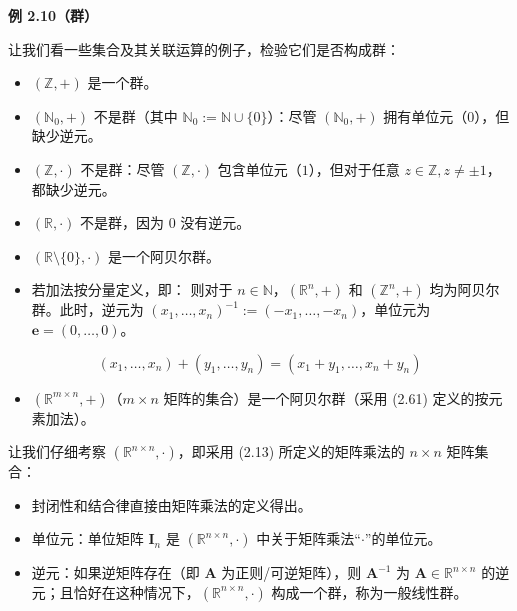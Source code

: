 \begin{notebox}
\textbf{例 2.10（群）}
\end{notebox}

\begin{notebox}
让我们看一些集合及其关联运算的例子，检验它们是否构成群：

\begin{itemize}
\item $ (\mathbb{Z}, +) $ 是一个群。
\item $ (\mathbb{N}_0, +) $ 不是群（其中 $ \mathbb{N}_0 := \mathbb{N} \cup \{0\} $）：尽管 $ (\mathbb{N}_0, +) $ 拥有单位元（$ 0 $），但缺少逆元。
\item $ (\mathbb{Z}, \cdot) $ 不是群：尽管 $ (\mathbb{Z}, \cdot) $ 包含单位元（$ 1 $），但对于任意 $ z \in \mathbb{Z}, z \neq \pm 1 $，都缺少逆元。
\item $ (\mathbb{R}, \cdot) $ 不是群，因为 $ 0 $ 没有逆元。
\item $ (\mathbb{R} \setminus \{0\}, \cdot) $ 是一个阿贝尔群。
\item 若加法按分量定义，即： 则对于 $ n \in \mathbb{N} $，$ (\mathbb{R}^n, +) $ 和 $ (\mathbb{Z}^n, +) $ 均为阿贝尔群。此时，逆元为 $ (x_1, \ldots, x_n)^{-1} := (-x_1, \ldots, -x_n) $，单位元为 $ \boldsymbol{e} = (0, \ldots, 0) $。
\end{itemize}
\begin{equation}
(x_1, \ldots, x_n) + (y_1, \ldots, y_n) = (x_1 + y_1, \ldots, x_n + y_n)
\tag{2.61}\label{eq:2-61}
\end{equation}
\begin{itemize}
\item $ (\mathbb{R}^{m \times n}, +) $（$ m \times n $ 矩阵的集合）是一个阿贝尔群（采用 (2.61) 定义的按元素加法）。
\end{itemize}
\end{notebox}

\begin{notebox}
让我们仔细考察 $ (\mathbb{R}^{n \times n}, \cdot) $，即采用 (2.13) 所定义的矩阵乘法的 $ n \times n $ 矩阵集合：

\begin{itemize}
\item 封闭性和结合律直接由矩阵乘法的定义得出。
\item 单位元：单位矩阵 $ \boldsymbol{I}_n $ 是 $ (\mathbb{R}^{n \times n}, \cdot) $ 中关于矩阵乘法“$ \cdot $”的单位元。
\item 逆元：如果逆矩阵存在（即 $ \boldsymbol{A} $ 为正则/可逆矩阵），则 $ \boldsymbol{A}^{-1} $ 为 $ \boldsymbol{A} \in \mathbb{R}^{n \times n} $ 的逆元；且恰好在这种情况下，$ (\mathbb{R}^{n \times n}, \cdot) $ 构成一个群，称为一般线性群。
\end{itemize}
\end{notebox}

